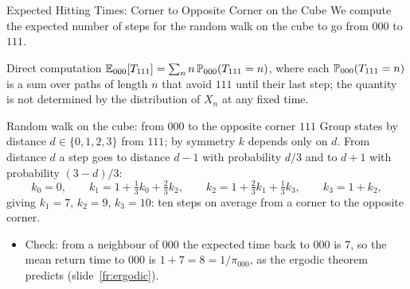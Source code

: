 \begin{frame}{Expected Hitting Times: Corner to Opposite Corner on the Cube}
  \label{fr:cubehit}
  \small
  We compute the expected number of steps for the random walk on the cube to go from $000$ to $111$.
  \begin{block}{Direct computation}
    $\mathbb{E}_{000}[T_{111}]=\sum_nn\,\mathbb{P}_{000}(T_{111}=n)$, where each $\mathbb{P}_{000}(T_{111}=n)$ is a sum over paths of length $n$ that avoid $111$ until their last step; the quantity is not determined by the distribution of $X_n$ at any fixed time.
  \end{block}
  \begin{exampleblock}{Random walk on the cube: from $000$ to the opposite corner $111$}
    Group states by distance $d\in\{0,1,2,3\}$ from $111$; by symmetry $k$ depends only on $d$. From distance $d$ a step goes to distance $d-1$ with probability $d/3$ and to $d+1$ with probability $(3-d)/3$:
    \[
      k_0=0,\qquad k_1=1+\tfrac13k_0+\tfrac23k_2,\qquad k_2=1+\tfrac23k_1+\tfrac13k_3,\qquad k_3=1+k_2 ,
    \]
    giving $k_1=7$, $k_2=9$, $k_3=10$: ten steps on average from a corner to the opposite corner.
  \end{exampleblock}
  \begin{itemize}
    \item Check: from a neighbour of $000$ the expected time back to $000$ is $7$, so the mean return time to $000$ is $1+7=8=1/\pi_{000}$, as the ergodic theorem predicts (slide~\ref{fr:ergodic}).
  \end{itemize}
\end{frame}

